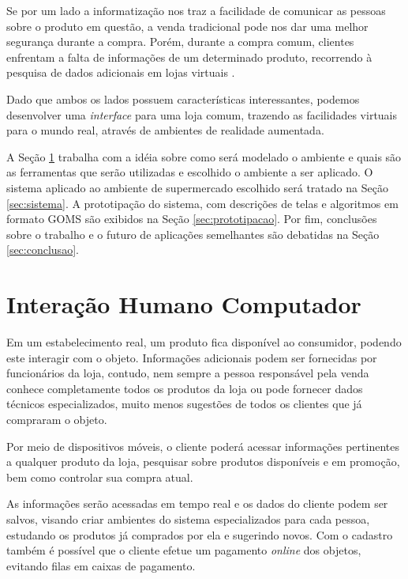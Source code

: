 \documentclass{article}
\begin{document}
Se por um lado a informatização nos traz a facilidade de comunicar as pessoas
sobre o produto em questão, a venda tradicional pode nos dar uma melhor
segurança durante a compra. Porém, durante a compra comum, clientes enfrentam a
falta de informações de um determinado produto, recorrendo à pesquisa de dados
adicionais em lojas virtuais \cite{vonreischach2009}.


Dado que ambos os lados possuem características interessantes, podemos
desenvolver uma \emph{interface} para uma loja comum, trazendo as facilidades
virtuais para o mundo real, através de ambientes de realidade aumentada.


A Seção \ref{sec:ihc} trabalha com a idéia sobre como será modelado o ambiente e
quais são as ferramentas que serão utilizadas e escolhido o ambiente a ser
aplicado. O sistema aplicado ao ambiente de supermercado escolhido será tratado
na Seção \ref{sec:sistema}. A prototipação do sistema, com descrições de telas e
algoritmos em formato GOMS são exibidos na Seção \ref{sec:prototipacao}. Por
fim, conclusões sobre o trabalho e o futuro de aplicações semelhantes são
debatidas na Seção \ref{sec:conclusao}.

\section{Interação Humano Computador}
\label{sec:ihc}


Em um estabelecimento real, um produto fica disponível ao consumidor, podendo
este interagir com o objeto. Informações adicionais podem ser fornecidas por
funcionários da loja, contudo, nem sempre a pessoa responsável pela venda
conhece completamente todos os produtos da loja ou pode fornecer dados técnicos
especializados, muito menos sugestões de todos os clientes que já compraram o
objeto.


Por meio de dispositivos móveis, o cliente poderá acessar informações
pertinentes a qualquer produto da loja, pesquisar sobre produtos disponíveis e
em promoção, bem como controlar sua compra atual.

As informações serão acessadas em tempo real e os dados do cliente podem ser
salvos, visando criar ambientes do sistema especializados para cada pessoa,
estudando os produtos já comprados por ela e sugerindo novos. Com o cadastro
também é possível que o cliente efetue um pagamento \emph{online} dos objetos,
evitando filas em caixas de pagamento.
\end{document}
